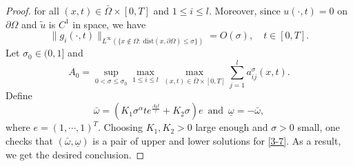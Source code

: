 \documentclass[11pt,reqno]{amsart}
\numberwithin{equation}{section}
\begin{document}
\begin{proof}
for all $(x,t)\in\bar{\Omega}\times[0,T]$ and $1\leq i \leq l$.
Moreover, since $u(\cdot,t)=0$ on $\partial\Omega$ and $\tilde u$ is $C^{1}$ in space, we have
\begin{equation*}
\|g_{i}(\cdot,t)\|_{L^\infty(\{x\notin\Omega:\ \mathrm{dist}(x,\partial\Omega)\le\sigma\})} = O(\sigma),
\quad t\in[0,T].
\end{equation*}
Let $\sigma_0\in(0,1]$ and
$$A_{0}= \sup_{0<\sigma \leq \sigma_{0}} \max_{1\leq i \leq l} \max_{ (x,t)\in \bar{\Omega}\times [0,T] } \sum_{j=1}^{l} a^{\sigma}_{ij}(x,t).$$
Define
\begin{equation*}
\bar{\omega}= \left(K_{1}\sigma^{\alpha}te^{\frac{A_{0}t}{\tau}}+K_{2}\sigma \right)e \enspace\text{and}\enspace\underline{\omega}=
-\bar{\omega},
\end{equation*}
where $e= (1,\cdots,1)^{T}$.
Choosing $K_{1},K_{2}>0$ large enough and $\sigma>0$ small, one checks that $(\bar{\omega},\underline{\omega})$ is a pair of upper and lower solutions for \eqref{3-7}.
As a result, we get the desired conclusion.
\end{proof}
\end{document}
